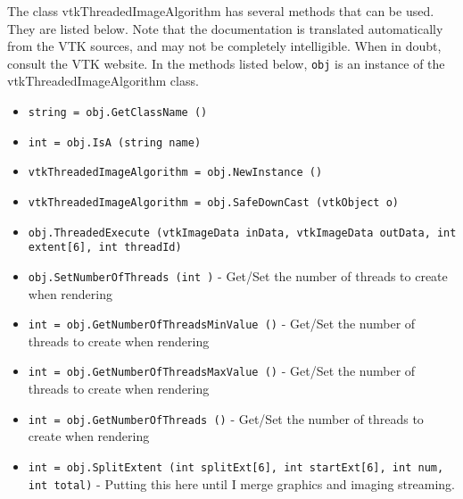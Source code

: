 The class vtkThreadedImageAlgorithm has several methods that can be used.
  They are listed below.
Note that the documentation is translated automatically from the VTK sources,
and may not be completely intelligible.  When in doubt, consult the VTK website.
In the methods listed below, \verb|obj| is an instance of the vtkThreadedImageAlgorithm class.
\begin{itemize}
\item  \verb|string = obj.GetClassName ()|

\item  \verb|int = obj.IsA (string name)|

\item  \verb|vtkThreadedImageAlgorithm = obj.NewInstance ()|

\item  \verb|vtkThreadedImageAlgorithm = obj.SafeDownCast (vtkObject o)|

\item  \verb|obj.ThreadedExecute (vtkImageData inData, vtkImageData outData, int extent[6], int threadId)|

\item  \verb|obj.SetNumberOfThreads (int )| -  Get/Set the number of threads to create when rendering

\item  \verb|int = obj.GetNumberOfThreadsMinValue ()| -  Get/Set the number of threads to create when rendering

\item  \verb|int = obj.GetNumberOfThreadsMaxValue ()| -  Get/Set the number of threads to create when rendering

\item  \verb|int = obj.GetNumberOfThreads ()| -  Get/Set the number of threads to create when rendering

\item  \verb|int = obj.SplitExtent (int splitExt[6], int startExt[6], int num, int total)| -  Putting this here until I merge graphics and imaging streaming.

\end{itemize}
